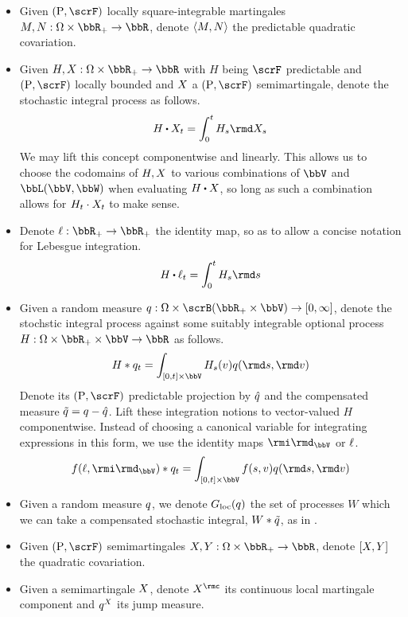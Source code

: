 \begin{itemize}
  \item
    Given $(\Prb,\scrF)$ locally square-integrable martingales $M, N: \Omega \times \bbR_+ \rightarrow \bbR$, denote ${\langle M , N \rangle}$ the predictable quadratic covariation.
  \item
    Given $H,\X: \Omega \times \bbR_+ \rightarrow \bbR$ with $H$ being $\scrF$ predictable and $(\Prb, \scrF)$ locally bounded and $X$ a $(\Prb, \scrF)$ semimartingale, denote the stochastic integral process as follows.
    \[
      H\shortInt \X_t = \int_0^t H_s \rmd\X_s
    \]
    We may lift this concept componentwise and linearly.
    This allows us to choose the codomains of $H, X$ to various combinations of $\vecSpace$ and $\bbL(\vecSpace, \bbW)$ when evaluating $H \shortInt \X$, so long as such a combination allows for $H_t \cdot X_t$ to make sense.
  \item
    Denote $\leb: \bbR_+ \rightarrow \bbR_+$ the identity map, so as to allow a concise notation for Lebesgue integration.
    \[
      H \shortInt \leb_t = \int_0^t H_s \rmd s
    \]
  \item
    Given a random measure $\jumpMeas: \Omega \times \scrB(\bbR_+ \times \vecSpace) \rightarrow [0,\infty]$, denote the stochstic integral process against some suitably integrable optional process $H: \Omega \times \bbR_+ \times \vecSpace \rightarrow \bbR$ as follows.
    \[
      H \ast \jumpMeas_t = \int_{[0,t] \times \vecSpace} H_s(\markVar) \jumpMeas(\rmd s, \rmd\markVar)
    \]
    Denote its $(\Prb, \scrF)$ predictable projection by $\hat{q}$ and the compensated measure $\tilde{q} = q - \hat{q}$.
    Lift these integration notions to vector-valued $H$ componentwise.
    Instead of choosing a canonical variable for integrating expressions in this form, we use the identity maps $\id_\vecSpace$ or $\ell$.
    \[
      f(\leb, \id_\vecSpace) \ast \jumpMeas_t = \int_{[0,t] \times \vecSpace} f(s, \markVar) \jumpMeas(\rmd s, \rmd\markVar)
    \]
  \item
    Given a random measure $q$, we denote $G_{\operatorname{loc}}(q)$ the set of processes $W$ which we can take a compensated stochastic integral, $W \ast \tilde{q}$, as in \cite[Definition 1.27(a)]{jacod2003}.
  \item
    Given $(\Prb, \scrF)$ semimartingales $\X, Y: \Omega \times \bbR_+ \rightarrow \bbR$, denote $[X,Y]$ the quadratic covariation.
  \item
    Given a semimartingale $X$, denote $\X^\rmc$ its continuous local martingale component and $q^X$ its jump measure.

\end{itemize}
